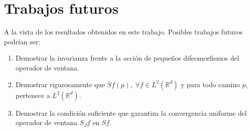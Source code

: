 \section{Trabajos futuros}
  \noindent A la vista de los resultados obtenidos en este trabajo. Posibles trabajos futuros podrían ser: 

  \begin{enumerate}
    \item Demostrar la invarianza frente a la acción de pequeños difeomorfismos del operador de ventana. 
    \item Demostrar rigurosamente  que $\overline{S}f(p), \; \forall f \in L^2(\mathbb{R}^d)$ y para todo camino $p$, pertenece a $L^2(\mathbb{R}^d)$. 
    \item Demostrar la condición suficiente que garantiza la convergencia uniforme del operador de ventana $S_Jf$ en $\overline{S}f$.
  \end{enumerate}
\endinput